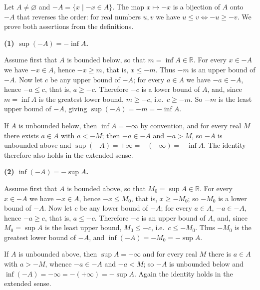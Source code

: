 \documentclass[11pt,a4paper]{article}
\newenvironment{solution}[1]{%
  \par\addvspace{1.7ex}%
  \noindent{\color{solutioncolor}\textbf{#1}}\hspace{0.55em}\ignorespaces}%
  {\par\addvspace{0.9ex}}
\begin{document}
\begin{solution}{Solution 2.4.5}\label{xs:2.4.5}
Let $A \ne \varnothing$ and $-A = \{x \mid -x \in A\}$. The map $x \mapsto -x$ is a bijection of $A$ onto $-A$ that reverses the order: for real numbers $u, v$ we have $u \le v \iff -u \ge -v$. We prove both assertions from the definitions.

\medskip
\noindent\textbf{(1) $\sup(-A) = -\inf A$.}

Assume first that $A$ is bounded below, so that $m = \inf A \in \mathbb{R}$. For every $x \in -A$ we have $-x \in A$, hence $-x \ge m$, that is, $x \le -m$. Thus $-m$ is an upper bound of $-A$. Now let $c$ be any upper bound of $-A$; for every $a \in A$ we have $-a \in -A$, hence $-a \le c$, that is, $a \ge -c$. Therefore $-c$ is a lower bound of $A$, and, since $m = \inf A$ is the greatest lower bound, $m \ge -c$, i.e.\ $c \ge -m$. So $-m$ is the least upper bound of $-A$, giving $\sup(-A) = -m = -\inf A$.

If $A$ is unbounded below, then $\inf A = -\infty$ by convention, and for every real $M$ there exists $a \in A$ with $a < -M$; then $-a \in -A$ and $-a > M$, so $-A$ is unbounded above and $\sup(-A) = +\infty = -(-\infty) = -\inf A$. The identity therefore also holds in the extended sense.

\medskip
\noindent\textbf{(2) $\inf(-A) = -\sup A$.}

Assume first that $A$ is bounded above, so that $M_0 = \sup A \in \mathbb{R}$. For every $x \in -A$ we have $-x \in A$, hence $-x \le M_0$, that is, $x \ge -M_0$; so $-M_0$ is a lower bound of $-A$. Now let $c$ be any lower bound of $-A$; for every $a \in A$, $-a \in -A$, hence $-a \ge c$, that is, $a \le -c$. Therefore $-c$ is an upper bound of $A$, and, since $M_0 = \sup A$ is the least upper bound, $M_0 \le -c$, i.e.\ $c \le -M_0$. Thus $-M_0$ is the greatest lower bound of $-A$, and $\inf(-A) = -M_0 = -\sup A$.

If $A$ is unbounded above, then $\sup A = +\infty$ and for every real $M$ there is $a \in A$ with $a > -M$, whence $-a \in -A$ and $-a < M$; so $-A$ is unbounded below and $\inf(-A) = -\infty = -(+\infty) = -\sup A$. Again the identity holds in the extended sense.
\end{solution}
\end{document}
